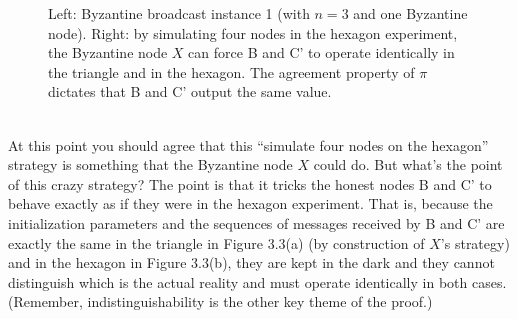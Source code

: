 \begin{figure}[h]
    \centering
    \qquad
    \caption{Left: Byzantine broadcast instance 1 (with $n = 3$ and one Byzantine node).
    Right: by simulating four nodes in the hexagon experiment, the Byzantine node $X$ can
    force B and C' to operate identically in the triangle and in the hexagon. The agreement
    property of $\pi$ dictates that B and C' output the same value.}
    \label{fig:example}%
\end{figure}\\

At this point you should agree that this “simulate four nodes on the hexagon” strategy is
something that the Byzantine node $X$ could do. But what’s the point of this crazy strategy?
The point is that it tricks the honest nodes B and C' to behave exactly as if they were in
the hexagon experiment. That is, because the initialization parameters and the sequences
of messages received by B and C' are exactly the same in the triangle in Figure 3.3(a) (by
construction of $X$’s strategy) and in the hexagon in Figure 3.3(b), they are kept in the dark and they
cannot distinguish which is the actual reality and must operate identically in both cases.
(Remember, indistinguishability is the other key theme of the proof.)

